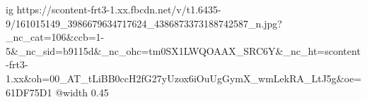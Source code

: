  
 
 
 
 

\ifcmt
  ig https://scontent-frt3-1.xx.fbcdn.net/v/t1.6435-9/161015149_3986679634717624_4386873373188742587_n.jpg?_nc_cat=106&ccb=1-5&_nc_sid=b9115d&_nc_ohc=tm0SX1LWQOAAX_SRC6Y&_nc_ht=scontent-frt3-1.xx&oh=00_AT_tLiBB0ccH2fG27yUzox6iOuUgGymX_wmLekRA_LtJ5g&oe=61DF75D1
  @width 0.45
\fi
